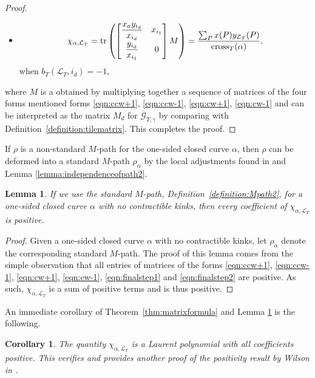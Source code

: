 \documentclass[10pt,a4paper]{amsart}
\numberwithin{equation}{section}
\newtheorem{Corollary}[Theorem]{Corollary}
\newtheorem{Lemma}[Theorem]{Lemma}
\theoremstyle{definition}
\begin{document}
\begin{proof}
\begin{itemize}
when $ b_{T}(\mathcal{L}_{T}, i_{d})=1$,
\item \[
\chi_{\alpha, \mathcal{L}_T}=\operatorname{tr}\left(\begin{bmatrix}
\dfrac{x_ay_{i_d}}{x_{i_d}} & x_{i_1}\vspace{1mm}\\
\dfrac{y_{i_d}}{x_{i_1}} & 0
\end{bmatrix}M\right)=\frac{\sum_P x(P)y_{\mathcal{L}_T}(P)}{\operatorname{cross}_T(\alpha)}, \]
 when $ b_{T}(\mathcal{L}_{T}, i_{d})=-1$,
\end{itemize}
where $M$ is a obtained by multiplying together a sequence of matrices of the four forms mentioned forms \eqref{eqn:ccw+1}, \eqref{eqn:ccw-1}, \eqref{eqn:cw+1}, \eqref{eqn:cw-1} and can be interpreted as the matrix $M_d$ for $\overline{\mathcal{G}}_{T, \gamma}$ by comparing with Definition~\ref{definition:tilematrix}. This completes the proof.
\end{proof}


If $\rho$ is a non-standard $M$-path for the one-sided closed curve $\alpha$, then $\rho$ can be deformed into a standard $M$-path $\rho_{\alpha}$ by the local adjustments found in \cite[Lemma 4.8]{MW13} and Lemma \ref{lemma:independenceofpath2}.

\begin{Lemma}\label{lemma:positivecoef}
If we use the standard $M$-path, Definition~{\rm\ref{definition:Mpath2}}, for a one-sided closed curve $\alpha$ with no contractible kinks, then every coefficient of $\chi_{\alpha, \mathcal{L}_T}$ is positive.
\end{Lemma}
\begin{proof}
Given a one-sided closed curve $\alpha$ with no contractible kinks, let $\rho_{\alpha}$ denote the corresponding standard $M$-path. The proof of this lemma comes from the simple observation that all entries of matrices of the forms \eqref{eqn:ccw+1}, \eqref{eqn:ccw-1}, \eqref{eqn:cw+1}, \eqref{eqn:cw-1}, \eqref{eqn:finalstep1} and \eqref{eqn:finalstep2} are positive. As such, $\chi_{\alpha, \mathcal{L}_T}$ is a sum of positive terms and is thus positive.
\end{proof}

An immediate corollary of Theorem~\ref{thm:matrixformula} and Lemma \ref{lemma:positivecoef} is the following.

\begin{Corollary}
The quantity $\chi_{\alpha, \mathcal{L}_T}$ is a Laurent polynomial with all coefficients positive. This verifies and provides another proof of the positivity result by Wilson in {\rm\cite{Wil19}}.
\end{Corollary}
\end{document}
